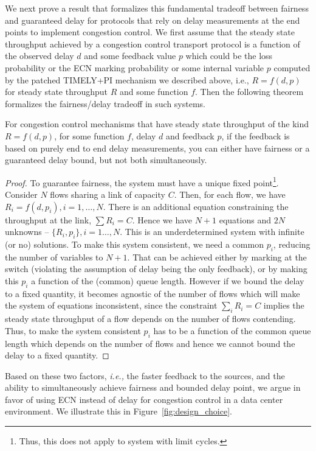 We next prove a result that formalizes this fundamental tradeoff between fairness
and guaranteed delay for protocols that rely on delay measurements at the end
points to implement congestion control. We first assume that the
steady state throughput achieved by a congestion control transport
protocol is a function of the observed delay $d$ and some feedback
value $p$ which could be the loss probability or the ECN marking
probability or some internal variable $p$ computed by the patched
TIMELY+PI mechanism we described above, i.e.,
$R = f(d,p)$ for steady state throughput $R$ and some function $f$. Then the
following theorem formalizes the fairness/delay tradeoff in such systems.

\begin{thm}
\label{thm:fairness-delay}
For congestion control mechanisms that have steady state throughput of
the kind $R = f(d,p)$, for some function $f$, delay $d$ and
feedback $p$, if the feedback is based on purely end to end
delay measurements, you can either have fairness or a guaranteed delay
bound, but not both simultaneously.
\end{thm}
\begin{proof}
To guarantee fairness, the system must have a
unique fixed point\footnote{Thus, this does not apply to system with
limit cycles\cite{dctcp-analysis}.}.
Consider $N$ flows sharing a link of capacity $C$. 
Then, for each flow, we have 
$ R_i = f(d,p_i), i = 1,\ldots,N.$
There is an additional equation constraining the throughput at the
link, $\sum R_i = C$.
Hence we have $N+1$ equations and $2 N$ unknowns -- $\{R_i,p_i\},
 i=1\ldots,N$. This is an underdetermined system with infinite (or no)
solutions. To make this system consistent, we need a common $p_i$,
reducing the number of variables to $N+1$. That can be achieved
either by marking at the switch (violating the assumption of delay
being the only feedback), or by making this $p_i$ a function of
the (common) queue length. However if we bound the delay to a fixed quantity,
it becomes agnostic of the number of flows which will make the system
of equations inconsistent, since the constraint $\sum_i R_i = C$
implies the steady state throughput of a flow depends on the number of
flows contending. Thus, to make the system consistent $p_i$ has to be
a function of the common queue length which depends on the number of flows and hence we cannot bound
the delay to a fixed quantity. 
\end{proof}

Based on these two factors, {\em i.e.,} the faster feedback to the sources, and
the ability to simultaneously achieve fairness and bounded delay point, we argue
in favor of using ECN instead of delay for congestion control in a data center
environment. We illustrate this in Figure~\ref{fig:design_choice}.

